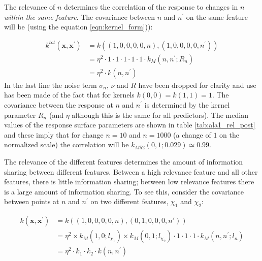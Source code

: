 The relevance of $n$ determines the correlation of the response to changes in $n$ \emph{within the same feature}. The covariance between $n$ and $n^{\prime}$ on the same feature will be (using the equation \ref{eqn:kernel_form})):

\begin{equation}
\begin{split}
    k^{tot}(\mathbf{x}, \mathbf{x}^{\prime})& = k\left((1, 0, 0, 0, 0, n), (1, 0, 0, 0, 0, n^{\prime})\right) \\
    & = \eta^{2}\cdot 1 \cdot 1\cdot 1 \cdot 1\cdot 1 \cdot k_{M}(n, n^{\prime}; R_{n}) \\
    & = \eta^{2}\cdot k(n, n^{\prime})
\end{split}
\end{equation}
In the last line the noise term $\sigma_{n}$, $\nu$ and $R$ have been dropped for clarity and use has been made of the fact that for kernels  $k(0, 0)=k(1,1)=1$. The covariance between the response at $n$ and $n^{\prime}$ is determined by the kernel parameter $R_{n}$ (and $\eta$ although this is the same for all predictors). The median values of the response surface parameters are shown in table \ref{tab:ala1_rel_post} and these imply that for change $n=10$ and $n=1000$ (a change of $1$ on the normalized scale) the correlation will be $k_{M52}(0,1; 0.029) \simeq 0.99$. 

The relevance of the different features determines the amount of information sharing between different features. Between a high relevance feature and all other features, there is little information sharing; between low relevance features there is a large amount of information sharing. To see this, consider the covariance between points at $n$ and $n^{\prime}$ on two different features, $\chi_1$ and $\chi_2$: 

\begin{equation}
\begin{split}
    k(\mathbf{x}, \mathbf{x}^{\prime})& = k\left((1, 0, 0, 0, 0, n), (0, 1, 0, 0, 0, n')\right) \\
    & = \eta^{2}\times k_{M}\left(1, 0; l_{\chi_1}\right) \times k_{M}\left(0, 1; l_{\chi_2}\right) \cdot 1 \cdot 1\cdot 1 \cdot k_{M}(n, n^{\prime}; l_{n}) \\
    &=  \eta^{2}\cdot k_{1}\cdot k_{2}\cdot k(n, n^{\prime})
\end{split}
\end{equation}

